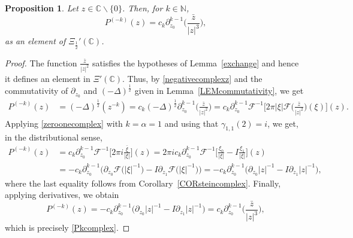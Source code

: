 \documentclass[reqno,11pt]{amsart}
\newtheorem{proposition}[theorem]{Proposition}
\theoremstyle{definition}
\begin{document}
\begin{proposition}
	Let $z \in \mathbb{C}\backslash \{0\}$. Then, for $k\in \mathbb{N}$,
	\begin{equation}
		\label{Pkcomplex}
		P^{(-k)}(z)= c_k\partial_{z_0}^{k-1}\bigg( \frac{\bar{z}}{|z|^{3}}\bigg),
	\end{equation}
	as an element of $\Xi_{\frac{1}{2}}'(\mathbb{C})$.
\end{proposition}
\begin{proof}
	The function $\frac{\overline{z}}{|z|^2}$ satisfies the hypotheses of Lemma~\ref{exchange} and hence it defines an element in $\Xi'(\mathbb{C})$. Thus, by \eqref{negativecomplexz} and the commutativity of $\partial_{z_0}$ and $(-\Delta)^{\frac{1}{2}}$ given in Lemma~\ref{LEMcommutativity}, we get
	\begin{align*}
		P^{(-k)}(z)&= (-\Delta)^{ \frac{1}{2}}(z^{-k})= c_k (-\Delta)^{ \frac{1}{2}} \partial_{z_0}^{k-1} \bigg(\frac{\bar{z}}{|z|^2} \bigg)= c_k \partial_{z_0}^{k-1} \mathcal{F}^{-1} \bigg[ 2\pi |\xi| \mathcal{F} \bigg( \frac{\bar{z}}{|z|^2}\bigg)(\xi) \bigg] (z).
	\end{align*}
	Applying \eqref{zeroonecomplex} with $k=\alpha=1$ and using that $\gamma_{1,1}(2)=i$, we get, in the distributional sense,	
	\begin{align*}
	P^{(-k)}(z) &= c_k \partial_{z_0}^{k-1} \mathcal{F}^{-1} \bigg[ 2\pi i   \frac{\bar{\xi}}{|\xi|} \bigg] (z) = 2\pi ic_k \partial_{z_0}^{k-1} \mathcal{F}^{-1} \bigg[   \frac{\xi_0}{|\xi|} - I\frac{\xi_1}{|\xi|} \bigg] (z)\\
	& = -c_k \partial_{z_0}^{k-1} \Big( \partial_{z_0} \mathcal{F}\big( |\xi|^{-1}\big) - I \partial_{z_1} \mathcal{F}\big( |\xi|^{-1}\big)\Big) = - c_k \partial_{z_0}^{k-1}  \Big( \partial_{z_0}|z|^{-1} - I \partial_{z_1}  |z|^{-1}\Big) ,
	\end{align*}
	where the last equality follows from Corollary~\ref{CORsteincomplex}.  Finally, applying derivatives, we obtain
	\[
	P^{(-k)}(z)  = - c_k \partial_{z_0}^{k-1}  \Big( \partial_{z_0}|z|^{-1} - I \partial_{z_1}  |z|^{-1}\Big) =  c_k \partial_{z_0}^{k-1}\bigg( \frac{\bar{z}}{|z|^{3}}\bigg),
	\]
	which is precisely \eqref{Pkcomplex}.
\end{proof}
\end{document}
